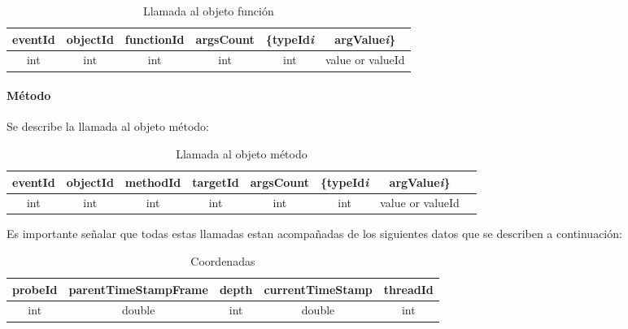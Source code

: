 \documentclass[12pt,legalpaper]{report}
\begin{document}
\begin{table}[!h]
\begin{center}
\begin{tabular}{| c | c | c | c | c | c |}
\hline
\rowcolor[gray]{0.9}eventId & objectId & functionId & argsCount & \{typeId\textit{{\scriptsize  i}} & argValue\textit{{\scriptsize  i}}\}\\
\hline
int & int & int & int & int & value or valueId\footnotemark[1]\\
\hline
\end{tabular}
\caption{Llamada al objeto función} 
\end{center}
\end{table}

				\paragraph{Método}

Se describe la llamada al objeto método:\\

\begin{table}[!h]
\begin{center}
\begin{tabular}{| c | c | c | c | c | c | c | c |}
\hline
\rowcolor[gray]{0.9}eventId & objectId & methodId & targetId & argsCount & \{typeId\textit{{\scriptsize  i}} & argValue\textit{{\scriptsize  i}}\}\\
\hline
int & int & int & int & int & int & value or valueId\footnotemark[1]\\
\hline
\end{tabular}
\caption{Llamada al objeto método} 
\end{center}
\end{table}


Es importante señalar que todas estas llamadas estan acompañadas de los siguientes datos que se describen a continuación:\\

\begin{table}[!h]
\begin{center}
\begin{tabular}{| c | c | c | c | c |}
\hline
\rowcolor[gray]{0.9}probeId & parentTimeStampFrame & depth & currentTimeStamp & threadId\\
\hline
int & double & int & double & int \\
\hline
\end{tabular}
\caption{Coordenadas} 
\label{Coordenadas}
\end{center}
\end{table}
\end{document}
